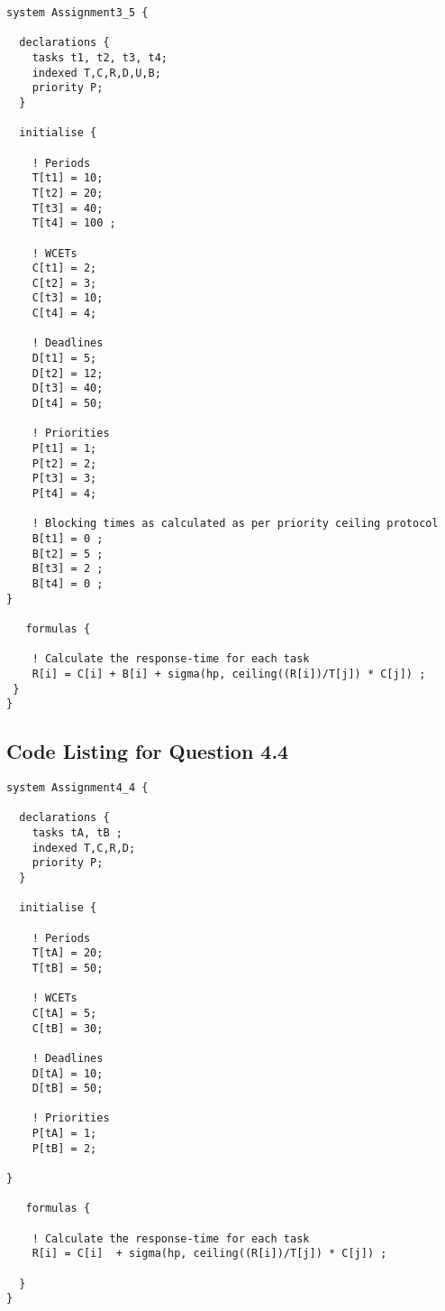 \documentclass[oneside,a4paper]{article}
\begin{document}
\begin{lstlisting}
system Assignment3_5 {

  declarations {    
    tasks t1, t2, t3, t4;
    indexed T,C,R,D,U,B;
    priority P;
  }

  initialise {

    ! Periods   
    T[t1] = 10;
    T[t2] = 20;
    T[t3] = 40;
    T[t4] = 100 ;
    
    ! WCETs
    C[t1] = 2;
    C[t2] = 3;
    C[t3] = 10;
    C[t4] = 4;

    ! Deadlines
    D[t1] = 5;
    D[t2] = 12;
    D[t3] = 40;
    D[t4] = 50;

    ! Priorities
    P[t1] = 1;
    P[t2] = 2;
    P[t3] = 3;
    P[t4] = 4;

    ! Blocking times as calculated as per priority ceiling protocol
    B[t1] = 0 ;
    B[t2] = 5 ;
    B[t3] = 2 ;
    B[t4] = 0 ;
}

   formulas {  

    ! Calculate the response-time for each task
    R[i] = C[i] + B[i] + sigma(hp, ceiling((R[i])/T[j]) * C[j]) ;
 }
}
\end{lstlisting}
\pagebreak
\subsection*{\normalsize{Code Listing for Question 4.4}}\label{Q4_4}
\begin{lstlisting}
system Assignment4_4 {

  declarations {    
    tasks tA, tB ;
    indexed T,C,R,D;
    priority P;
  }

  initialise {

    ! Periods   
    T[tA] = 20;
    T[tB] = 50;
    
    ! WCETs
    C[tA] = 5;
    C[tB] = 30;

    ! Deadlines
    D[tA] = 10;
    D[tB] = 50;

    ! Priorities
    P[tA] = 1;
    P[tB] = 2;

}

   formulas {  

    ! Calculate the response-time for each task
    R[i] = C[i]  + sigma(hp, ceiling((R[i])/T[j]) * C[j]) ;

  }
}
\end{lstlisting}
\pagebreak
\end{document}
